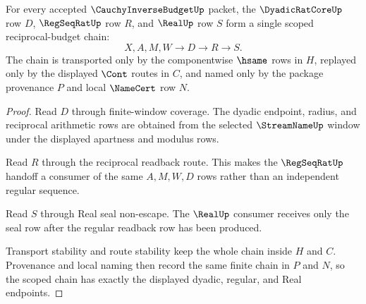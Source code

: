 \begin{theorem}
\label{thm:cauchy-inverse-budget-dyadic-regseq-real-scope}
For every accepted $\CauchyInverseBudgetUp$ packet, the $\DyadicRatCoreUp$ row $D$, $\RegSeqRatUp$ row $R$, and $\RealUp$ row $S$ form a single scoped reciprocal-budget chain:
$$
X,A,M,W \longrightarrow D \longrightarrow R \longrightarrow S.
$$
The chain is transported only by the componentwise $\hsame$ rows in $H$, replayed only by the displayed $\Cont$ routes in $C$, and named only by the package provenance $P$ and local $\NameCert$ row $N$.
\end{theorem}
\begin{proof}
Read $D$ through finite-window coverage. The dyadic endpoint, radius, and reciprocal arithmetic rows are obtained from the selected $\StreamNameUp$ window under the displayed apartness and modulus rows.

Read $R$ through the reciprocal readback route. This makes the $\RegSeqRatUp$ handoff a consumer of the same $A,M,W,D$ rows rather than an independent regular sequence.

Read $S$ through Real seal non-escape. The $\RealUp$ consumer receives only the seal row after the regular readback row has been produced.

Transport stability and route stability keep the whole chain inside $H$ and $C$. Provenance and local naming then record the same finite chain in $P$ and $N$, so the scoped chain has exactly the displayed dyadic, regular, and Real endpoints.
\end{proof}


